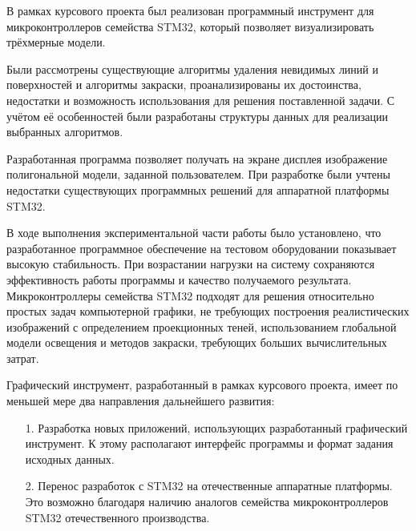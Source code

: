 \Conclusion %
В рамках курсового проекта был реализован программный инструмент для микроконтроллеров семейства STM32, который позволяет 
визуализировать трёхмерные модели.

Были рассмотрены существующие алгоритмы удаления невидимых линий и поверхностей и алгоритмы закраски, проанализированы 
их достоинства, недостатки и возможность использования для решения поставленной задачи. С учётом её особенностей были 
разработаны структуры данных для реализации выбранных алгоритмов.

Разработанная программа позволяет получать на экране дисплея изображение полигональной модели, заданной пользователем. При 
разработке были учтены недостатки существующих программных решений для аппаратной платформы STM32.

В ходе выполнения экспериментальной части работы было установлено, что разработанное программное обеспечение на тестовом оборудовании 
показывает высокую стабильность. При возрастании нагрузки на систему сохраняются эффективность работы программы и качество получаемого 
результата. Микроконтроллеры семейства STM32 подходят для решения относительно простых задач компьютерной графики, не требующих 
построения реалистических изображений с определением проекционных теней, использованием глобальной модели освещения и методов закраски, 
требующих больших вычислительных затрат.

Графический инструмент, разработанный в рамках курсового проекта, имеет по меньшей мере два направления дальнейшего развития:
\begin{enumerate}
	\item[1.] Разработка новых приложений, использующих разработанный графический инструмент. К этому располагают интерфейс программы и формат задания исходных данных.
	\item[2.] Перенос разработок с STM32 на отечественные аппаратные платформы. Это возможно благодаря наличию аналогов семейства микроконтроллеров STM32 отечественного производства.
\end{enumerate}

